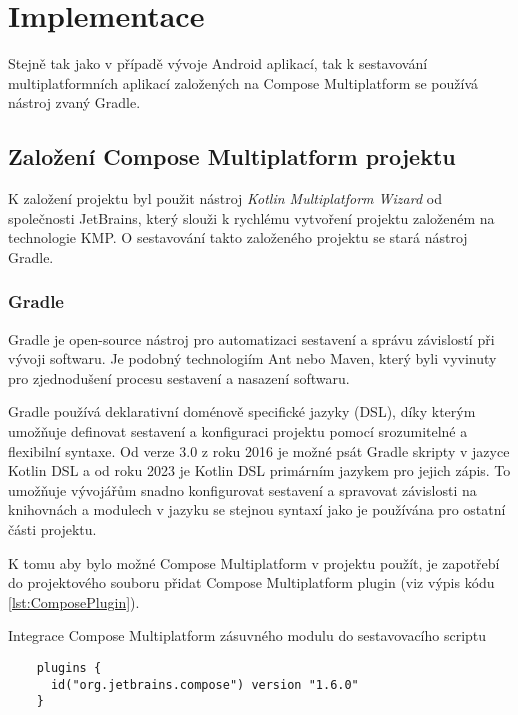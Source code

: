 \chapter{Implementace}
Stejně tak jako v případě vývoje Android aplikací, tak k sestavování multiplatformních aplikací založených na Compose Multiplatform 
se používá nástroj zvaný Gradle.  

\section{Založení Compose Multiplatform projektu}
K založení projektu byl použit nástroj \textit{Kotlin Multiplatform Wizard} od společnosti JetBrains, který slouži k rychlému vytvoření projektu
založeném na technologie KMP. O sestavování takto založeného projektu se stará nástroj Gradle.

\subsection{Gradle} \label{gradleChapter}
Gradle je open-source nástroj pro automatizaci sestavení a správu závislostí při vývoji softwaru. Je 
podobný technologiím Ant nebo Maven, který byli vyvinuty pro zjednodušení procesu sestavení a nasazení softwaru.

Gradle používá deklarativní doménově specifické jazyky (DSL), díky kterým umožňuje definovat sestavení a konfiguraci projektu pomocí srozumitelné
a flexibilní syntaxe. Od verze 3.0 z roku 2016 je možné psát Gradle skripty v jazyce Kotlin DSL a od roku 2023 je Kotlin DSL primárním jazykem 
pro jejich zápis. To umožňuje vývojářům snadno konfigurovat sestavení a spravovat závislosti na knihovnách a modulech v jazyku se stejnou
syntaxí jako je používána pro ostatní části projektu. 



K tomu aby bylo možné Compose Multiplatform v projektu použít, je zapotřebí do projektového souboru  přidat Compose 
Multiplatform plugin (viz výpis kódu \ref{lst:ComposePlugin}).

\begin{listing}[H]
\caption{Integrace Compose Multiplatform zásuvného modulu do sestavovacího scriptu}\label{lst:ComposePlugin}
\begin{verbatim}
    plugins {
      id("org.jetbrains.compose") version "1.6.0"
    }
\end{verbatim}
\end{listing}



